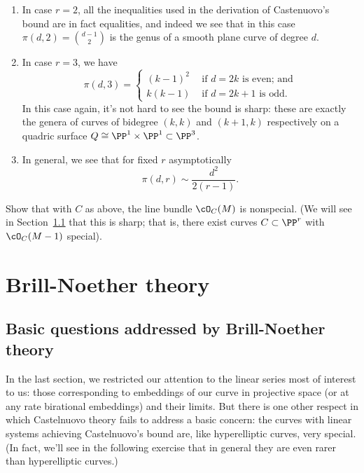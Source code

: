 %

\begin{enumerate}
\item In case $r=2$, all the inequalities used in the derivation of Castenuovo's bound are in fact equalities, and indeed we see that in this case $\pi(d,2) = \binom{d-1}{2}$ is the genus of a smooth plane curve of degree $d$.

\item In case $r=3$, we have
$$
\pi(d,3) =
\begin{cases}
\left( k - 1 \right)^2 &\text{ if $d=2k$ is even; and} \\
k(k-1) &\text{ if $d=2k+1$ is odd.}
\end{cases}
$$
In this case again, it's not hard to see the bound is sharp: these are exactly the genera of curves of bidegree $(k,k)$ and $(k+1,k)$ respectively on a quadric surface $Q \cong \PP^1 \times \PP^1 \subset \PP^3$.
\item In general, we see that for fixed $r$ asymptotically
$$
\pi(d,r) \sim \frac{d^2}{2(r-1)}.
$$
\end{enumerate}


\begin{exercise}
Show that with $C$ as above, the line bundle $\cO_C(M)$ is nonspecial. (We will see in Section~\ref{} that this is sharp; that is, there exist curves $C \subset \PP^r$ with $\cO_C(M-1)$ special).
\end{exercise}


\section{Brill-Noether theory}

\subsection{Basic questions addressed by Brill-Noether theory}

In the last section, we restricted our attention to the linear series most of interest to us: those corresponding to embeddings of our curve in projective space (or at any rate birational embeddings) and their limits. But there is one other respect in which Castelnuovo theory fails to address a basic concern: the curves with linear systems achieving Castelnuovo's bound are, like hyperelliptic curves, very special. (In fact, we'll see in the following exercise that in general they are even rarer than hyperelliptic curves.) 


